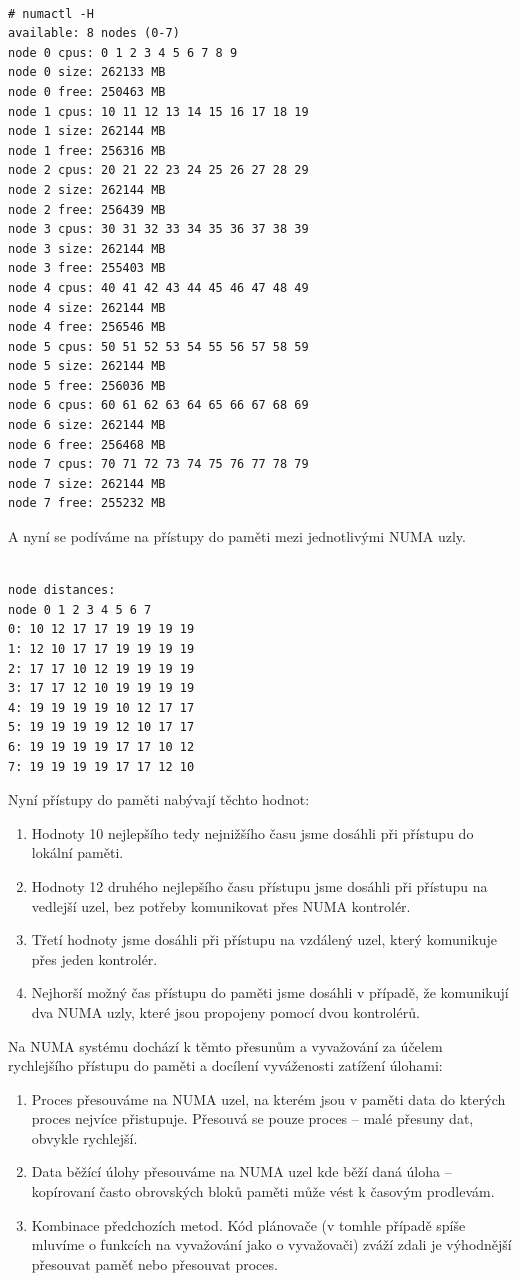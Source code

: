 \documentclass[
  master=true,
  font=sans,
  printversion=false,
  joinlists=true,
  figures=true,
  tables=true,
  sourcecodes=false,
  theorems=false,
  bibencoding=utf8,
  language=czech,
  encoding=utf8,
  field=ainfk,
  biblatex,
  glossaries,
  index
]{kidiplom}
\begin{document}
\begin{verbatim}

# numactl -H
available: 8 nodes (0-7)
node 0 cpus: 0 1 2 3 4 5 6 7 8 9
node 0 size: 262133 MB
node 0 free: 250463 MB
node 1 cpus: 10 11 12 13 14 15 16 17 18 19
node 1 size: 262144 MB
node 1 free: 256316 MB
node 2 cpus: 20 21 22 23 24 25 26 27 28 29
node 2 size: 262144 MB
node 2 free: 256439 MB
node 3 cpus: 30 31 32 33 34 35 36 37 38 39
node 3 size: 262144 MB
node 3 free: 255403 MB
node 4 cpus: 40 41 42 43 44 45 46 47 48 49
node 4 size: 262144 MB
node 4 free: 256546 MB
node 5 cpus: 50 51 52 53 54 55 56 57 58 59
node 5 size: 262144 MB
node 5 free: 256036 MB
node 6 cpus: 60 61 62 63 64 65 66 67 68 69
node 6 size: 262144 MB
node 6 free: 256468 MB
node 7 cpus: 70 71 72 73 74 75 76 77 78 79
node 7 size: 262144 MB
node 7 free: 255232 MB

\end{verbatim}

\newpage
\noindent
A nyní se podíváme na přístupy do paměti mezi jednotlivými NUMA uzly. 
\begin{verbatim}

node distances:
node 0 1 2 3 4 5 6 7
0: 10 12 17 17 19 19 19 19
1: 12 10 17 17 19 19 19 19
2: 17 17 10 12 19 19 19 19
3: 17 17 12 10 19 19 19 19
4: 19 19 19 19 10 12 17 17
5: 19 19 19 19 12 10 17 17
6: 19 19 19 19 17 17 10 12
7: 19 19 19 19 17 17 12 10

\end{verbatim}
\noindent
Nyní přístupy do paměti nabývají těchto hodnot:
\begin{enumerate}
\item Hodnoty 10 nejlepšího tedy nejnižšího času jsme dosáhli při přístupu do lokální paměti.
\item Hodnoty 12 druhého nejlepšího času přístupu jsme dosáhli při přístupu na vedlejší uzel, bez potřeby komunikovat přes NUMA kontrolér. 
\item Třetí hodnoty jsme dosáhli při přístupu na vzdálený uzel, který komunikuje přes jeden kontrolér.
\item Nejhorší možný čas přístupu do paměti jsme dosáhli v případě, že komunikují dva NUMA uzly, které jsou propojeny pomocí dvou kontrolérů.
\end{enumerate}

\noindent
Na NUMA systému dochází k těmto přesunům a vyvažování za účelem rychlejšího přístupu do paměti a docílení vyváženosti zatížení úlohami: 

\begin{enumerate}
\item Proces přesouváme na NUMA uzel, na kterém jsou v paměti data do kterých proces nejvíce přistupuje. Přesouvá se pouze proces – malé přesuny dat, obvykle rychlejší. 
\item Data běžící úlohy přesouváme na NUMA uzel kde běží daná úloha – kopírovaní často obrovských bloků paměti může vést k časovým prodlevám.
\item Kombinace předchozích metod. Kód plánovače (v tomhle případě spíše mluvíme o funkcích na vyvažování jako o vyvažovači) zváží zdali je výhodnější přesouvat paměť nebo přesouvat proces.
\end{enumerate}
\end{document}
